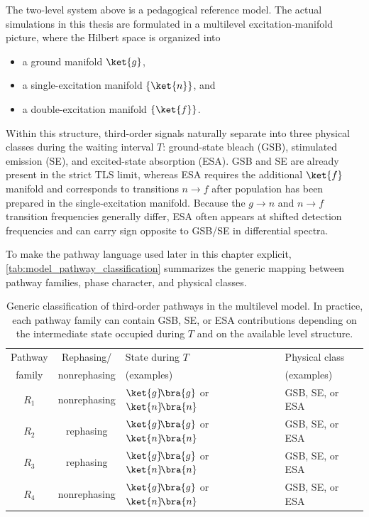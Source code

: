 The two-level system above is a pedagogical reference model. The actual simulations in this thesis are formulated in a multilevel excitation-manifold picture, where the Hilbert space is organized into
\begin{itemize}
\item a ground manifold $\ket{g}$,
\item a single-excitation manifold $\{\ket{n}\}$, and
\item a double-excitation manifold $\{\ket{f}\}$.
\end{itemize}
Within this structure, third-order signals naturally separate into three physical classes during the waiting interval $T$: ground-state bleach (GSB), stimulated emission (SE), and excited-state absorption (ESA).
GSB and SE are already present in the strict TLS limit, whereas ESA requires the additional $\ket{f}$ manifold and corresponds to transitions $n\rightarrow f$ after population has been prepared in the single-excitation manifold.
Because the $g\rightarrow n$ and $n\rightarrow f$ transition frequencies generally differ, ESA often appears at shifted detection frequencies and can carry sign opposite to GSB/SE in differential spectra.

To make the pathway language used later in this chapter explicit, \autoref{tab:model_pathway_classification} summarizes the generic mapping between pathway families, phase character, and physical classes.
\begin{table}[htbp]
\centering
\caption{Generic classification of third-order pathways in the multilevel model. In practice, each pathway family can contain GSB, SE, or ESA contributions depending on the intermediate state occupied during $T$ and on the available level structure.}
\label{tab:model_pathway_classification}
\begin{tabular}{c c l l}
\hline\hline
Pathway & Rephasing/ & State during $T$ & Physical class \\
family & nonrephasing & (examples) & (examples) \\
\hline
$R_1$ & nonrephasing & $\ket{g}\!\bra{g}$ or $\ket{n}\!\bra{n}$ & GSB, SE, or ESA \\
$R_2$ & rephasing & $\ket{g}\!\bra{g}$ or $\ket{n}\!\bra{n}$ & GSB, SE, or ESA \\
$R_3$ & rephasing & $\ket{g}\!\bra{g}$ or $\ket{n}\!\bra{n}$ & GSB, SE, or ESA \\
$R_4$ & nonrephasing & $\ket{g}\!\bra{g}$ or $\ket{n}\!\bra{n}$ & GSB, SE, or ESA \\
\hline\hline
\end{tabular}
\end{table}


